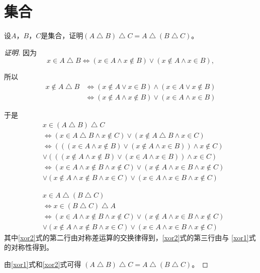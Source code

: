 \chapter{集合}
\begin{Ex}
设$A$，$B$，$C$是集合，证明$(A\bigtriangleup B)\bigtriangleup C =
A\bigtriangleup (B\bigtriangleup C)$。
\end{Ex}
\begin{proof}[证明]
  
  因为
  \begin{equation}
  x \in A \bigtriangleup B \Leftrightarrow
  (x \in A \land x \notin B) \lor (x \notin A \land x
  \in B),    
  \end{equation}

  所以
  \begin{equation}
    \begin{split}
      x \notin A \bigtriangleup B &\Leftrightarrow
  (x \notin A \lor x \in B) \land (x \in A \lor x
  \notin B)\\
  &\Leftrightarrow (x \notin A \land x \notin B) \lor (x \in A \land x \in B )
    \end{split}
  \end{equation}

  于是
  \begin{equation}\label{xor1}
    \begin{split}
      &x \in (A \bigtriangleup B) \bigtriangleup C\\
      &\Leftrightarrow (x \in A \bigtriangleup B \land x \notin C) \lor (x \notin A \bigtriangleup B \land x \in C)\\
      &\Leftrightarrow (((x \in A \land x \notin B) \lor (x \notin A \land x \in B)) \land x \notin C)\\
      &\lor (((x \notin A \land x \notin B) \lor (x \in A \land x \in B )) \land x \in C)\\
      &\Leftrightarrow (x \in A \land x \notin B \land x \notin C) \lor (x \notin A \land x \in B \land x \notin C)\\
      &\lor (x \notin A \land x \notin B \land x \in C) \lor (x \in A \land x \in B \land x \notin C)
    \end{split}
  \end{equation}

  \begin{equation}\label{xor2}
    \begin{split}
      &x \in A \bigtriangleup (B \bigtriangleup C)\\
      &\Leftrightarrow x \in (B \bigtriangleup C) \bigtriangleup A\\
      &\Leftrightarrow (x \in A \land x \notin B \land x \notin C) \lor (x \notin A \land x \in B \land x \notin C)\\
      &\lor (x \notin A \land x \notin B \land x \in C) \lor (x \in A \land x \in B \land x \notin C)
    \end{split}
  \end{equation}
  其中\eqref{xor2}式的第二行由对称差运算的交换律得到，\eqref{xor2}式的第三行由与
   \eqref{xor1}式的对称性得到。

  由\eqref{xor1}式和\eqref{xor2}式可得
  $(A\bigtriangleup B)\bigtriangleup C = A\bigtriangleup (B\bigtriangleup C)$。
\end{proof}
 